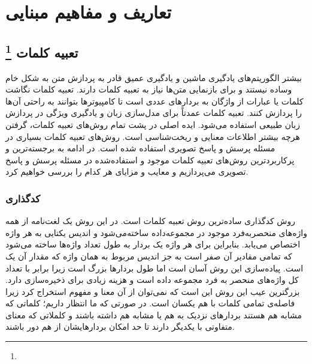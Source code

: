 \chapter{تعاریف و مفاهیم مبنایی}
\thispagestyle{empty}

\section{تعبیه کلمات \protect \footnote{}}
	بیشتر الگوریتم‌های یادگیری ماشین و یادگیری عمیق  قادر به پردازش متن به شکل خام وساده نیستند  و برای بازنمایی متن‌ها نیاز به تعبیه کلمات دارند. تعبیه کلمات نگاشت کلمات یا عبارات از واژگان به بردارهای عددی است تا کامپیوترها بتوانند به راحتی آن‌ها را پردازش کنند. تعبیه کلمات عمدتاً برای مدل‌سازی زبان و یادگیری ویژگی در پردازش زبان طبیعی استفاده می‌شود. ایده اصلی در پشت تمام روش‌های تعبیه کلمات، گرفتن هرچه بیشتر اطلاعات معنایی و ریخت‌شناسی است. روش‌های تعبیه کلمات بسیاری در مسئله پرسش و پاسخ تصویری استفاده شده است. در ادامه به برجسته‌ترین و پرکاربردترین روش‌های تعبیه کلمات موجود و استفاده‌شده در مسئله پرسش و پاسخ تصویری می‌پردازیم و معایب و مزایای هر کدام را بررسی خواهیم کرد.
\subsection{کدگذاری }
	روش کدگذاری
	ساده‌ترین روش تعبیه کلمات است. در این روش یک لغت‌‌نامه از همه واژه‌های منحصربه‌فرد موجود در مجموعه‌داده ساخته‌می‌شود و اندیس یکتایی به هر واژه اختصاص می‌یابد. بنابراین برای هر واژه یک بردار به طول تعداد واژ‌ه‌ها ساخته می‌شود که تمامی مقادیر آن صفر است به جز اندیس مربوط به همان واژه که مقدار آن یک است. پیاده‌سازی این روش آسان است اما طول بردارها  بزرگ است زیرا برابر با تعداد کل واژه‌های منحصر به فرد مجموعه داده است و هزینه زیادی برای ذخیره‌سازی دارد. بزرگترین عیب این روش  این است که نمی‌توان از آن معنا  و مفهوم استخراج کرد زیرا فاصله‌ی تمامی کلمات با هم یکسان است. در صورتی که ما انتظار داریم؛ کلماتی که مشابه هم هستند بردارهای نزدیک به هم یا مشابه هم داشته باشند و کلملاتی که معنای متفاوتی با یکدیگر دارند تا حد امکان بردارهایشان از هم دور باشند. 

